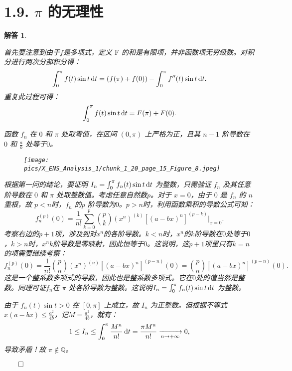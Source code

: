 \documentclass[12pt,UTF8]{ctexbook}
\theoremstyle{exercisestyle}
\theoremstyle{solutionstyle}
\newtheorem*{solution*}{解答}
\newenvironment{solution}
  {\begin{solution*}}
  {\hfill\ensuremath{\qed}\end{solution*}}
\begin{document}
\section{1.9. $\pi$ 的无理性}
\begin{solution}
  \begin{subquestions}
    \item 首先要注意到由于$f$是多项式，定义 $\mathrm{F}$ 的和是有限项，并非函数项无穷级数。对积分进行两次分部积分得：
    $$
    \int_0^{\pi} f(t) \sin t \,\mathrm{d}t = \left(f(\pi) + f(0)\right) - \int_0^{\pi} f''(t) \sin t \,\mathrm{d}t.
    $$
    重复此过程可得：
    $$
    \int_0^{\pi} f(t) \sin t \,\mathrm{d}t = F(\pi) + F(0).
    $$
    \item 函数 $f_n$ 在 $0$ 和 $\pi$ 处取零值，在区间 $(0, \pi)$ 上严格为正，且其 $n-1$ 阶导数在 $0$ 和 $\frac{a}{b}$ 处等于$0$。
    \begin{figure}[htbp]
      \centering
      \texttt{[image: pics/X\_ENS\_Analysis\_1/chunk\_1\_20\_page\_15\_Figure\_8.jpeg]}
    \end{figure}
    \item 根据第一问的结论，要证明 $I_n = \int_0^{\pi} f_n(t) \sin t \,\mathrm{d}t$ 为整数，只需验证 $f_n$ 及其任意阶导数在 $0$ 和 $\pi$ 处取整数值。考虑任意自然数$p$。对于 $x=0$，由于 $0$ 是 $f_n$ 的 $n$ 重根，故 $p < n$时，$f_n$ 的$p$ 阶导数为$0$。$p > n$时，利用函数乘积的导数公式可知：
    $$
    f_n^{(p)}(0) = \frac{1}{n!} \sum_{k=0}^p \binom{p}{k} (x^n)^{(k)} [(a - bx)^n]^{(p-k)} \Big|_{x=0}.
    $$
    考察右边的$p + 1$项，涉及到对$x^n$的各阶导数。$k < n$时，$x^n$的$k$阶导数在$0$处等于$0$，$k > n$时，$x^n$$k$阶导数是零映射，因此恒等于$0$。这说明，这$p + 1$项里只有$k=n$的项需要继续考察：
    $$
    f_n^{(p)}(0) = \frac{1}{n!}\binom{p}{n} (x^n)^{(n)}[(a - bx)^n]^{(p-n)}(0) = \binom{p}{n} [(a - bx)^n]^{(p-n)}(0).
    $$
    这是一个整系数多项式的导数，因此也是整系数多项式。它在$0$处的值当然是整数。同理可证$f_n$在 $\pi$ 处各阶导数为整数。这说明$I_n = \int_0^{\pi} f_n(t) \sin t \,\mathrm{d}t$ 为整数。
    
    由于 $f_n(t) \sin t > 0$ 在 $[0, \pi]$ 上成立，故 $I_n$ 为正整数。但根据不等式 $\displaystyle x(a - bx) \leq \frac{a^2}{4b}$，记$\displaystyle M = \frac{a^2}{4b}$，就有：
    $$
    1 \leq I_n \leq \int_0^\pi \frac{M^n}{n!} \,\mathrm{d}t = \frac{\pi M^n}{n!} \xrightarrow[n \to +\infty]{} 0,
    $$
    导致矛盾！故 $\pi \notin \mathbb{Q}$。
  \end{subquestions}
\end{solution}
\end{document}
